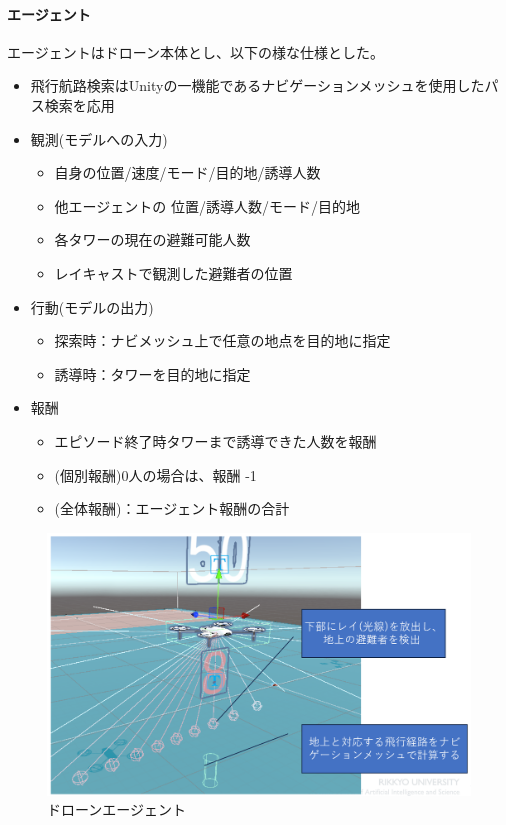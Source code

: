 \paragraph{エージェント}
エージェントはドローン本体とし、以下の様な仕様とした。
\begin{itemize}
    \item 飛行航路検索はUnityの一機能であるナビゲーションメッシュを使用したパス検索を応用
    \item 観測(モデルへの入力)
    \begin{itemize}
        \item 自身の位置/速度/モード/目的地/誘導人数
        \item 他エージェントの 位置/誘導人数/モード/目的地
        \item 各タワーの現在の避難可能人数
        \item レイキャストで観測した避難者の位置
    \end{itemize}
    \item 行動(モデルの出力)
    \begin{itemize}
        \item 探索時：ナビメッシュ上で任意の地点を目的地に指定
        \item 誘導時：タワーを目的地に指定
    \end{itemize}
    \item 報酬
    \begin{itemize}
        \item エピソード終了時タワーまで誘導できた人数を報酬
        \item (個別報酬)0人の場合は、報酬 -1
        \item (全体報酬)：エージェント報酬の合計
    \end{itemize}
\end{itemize}
\begin{figure}[H]
    \centering
    \includegraphics[scale=0.5]{./images/droneagent.png}
    \caption{
       ドローンエージェント
    }
\end{figure}
    
